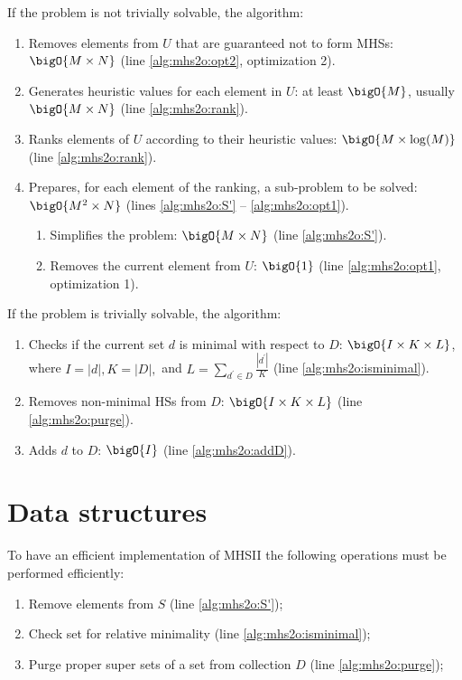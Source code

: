If the problem is not trivially solvable, the algorithm:
\begin{enumerate}
\item Removes elements from $U$ that are guaranteed not to form
  \acp{MHS}: $\bigO{M\times N}$ (line \ref{alg:mhs2o:opt2},
  optimization 2).
\item Generates heuristic values for each element in $U$: at least
  $\bigO{M}$, usually $\bigO{M\times N}$ (line \ref{alg:mhs2o:rank}).
\item Ranks elements of $U$ according to their heuristic values:
  $\bigO{M \times \log(M)}$ (line \ref{alg:mhs2o:rank}).
\item Prepares, for each element of the ranking, a sub-problem to be
  solved: $\bigO{M^2 \times N}$ (lines \ref{alg:mhs2o:S'} --
  \ref{alg:mhs2o:opt1}).
  \begin{enumerate}
  \item Simplifies the problem: $\bigO{M\times N}$ (line
    \ref{alg:mhs2o:S'}).
  \item Removes the current element from $U$: $\bigO{1}$ (line
    \ref{alg:mhs2o:opt1}, optimization 1).
  \end{enumerate}
\end{enumerate}

If the problem is trivially solvable, the algorithm:
\begin{enumerate}
\item Checks if the current set $d$ is minimal with respect to $D$:
  $\bigO{I\times K\times L}$, where $I = |d|, K = |D|, $ and $L =
  \sum_{d^\prime\in D} \frac{|d^\prime|}{K}$ (line
  \ref{alg:mhs2o:isminimal}).
\item Removes non-minimal \acp{HS} from $D$: $\bigO{I\times K\times
    L}$ (line \ref{alg:mhs2o:purge}).
\item Adds $d$ to $D$: $\bigO{I}$ (line \ref{alg:mhs2o:addD}).
\end{enumerate}

\section{Data structures}
\label{sec:mhs2o:datastructures}
To have an efficient implementation of \ac{MHSII} the following
operations must be performed efficiently:
\begin{enumerate}
\item Remove elements from $S$ (line \ref{alg:mhs2o:S'});
\item Check set for relative minimality (line \ref{alg:mhs2o:isminimal});
\item Purge proper super sets of a set from collection $D$ (line
  \ref{alg:mhs2o:purge});
\end{enumerate}

